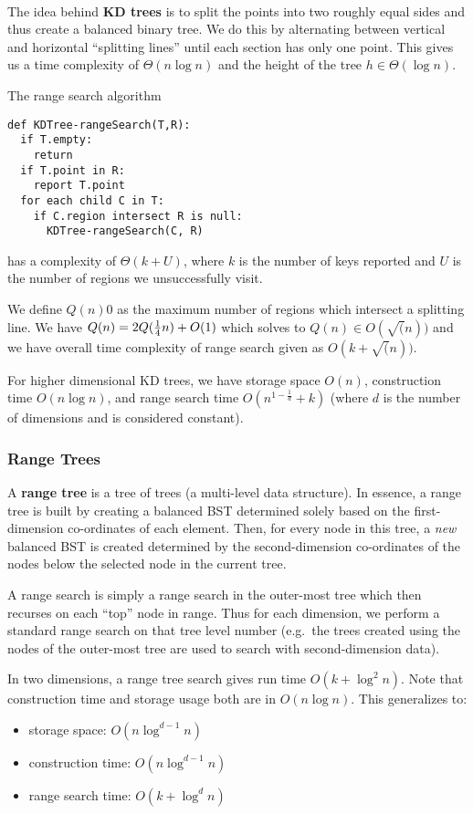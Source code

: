 \documentclass[12pt]{article}
\begin{document}
\paragraph{} The idea behind {\bf KD trees} is to split the points into two roughly equal sides and thus create a balanced binary tree. We do this by alternating between vertical and horizontal ``splitting lines'' until each section has only one point. This gives us a time complexity of $\Theta(n\log n)$ and the height of the tree $h\in \Theta(\log n)$.

The range search algorithm
\begin{verbatim}
def KDTree-rangeSearch(T,R):
  if T.empty:
    return
  if T.point in R:
    report T.point
  for each child C in T:
    if C.region intersect R is null:
      KDTree-rangeSearch(C, R)
\end{verbatim}
has a complexity of $\Theta(k + U)$, where $k$ is the number of keys reported and $U$ is the number of regions we unsuccessfully visit.

We define $Q(n)0$ as the maximum number of regions which intersect a splitting line. We have $Q(n) = 2Q(\frac{1}{4} n) + O(1)$ which solves to $Q(n) \in O(\sqrt(n))$ and we have overall time complexity of range search given as $O(k + \sqrt(n))$.

For higher dimensional KD trees, we have storage space $O(n)$, construction time $O(n\log n)$, and range search time $O(n^{1-\frac{1}{d}} + k)$ (where $d$ is the number of dimensions and is considered constant).

\subsubsection{Range Trees}
A {\bf range tree} is a tree of trees (a multi-level data structure). In essence, a range tree is built by creating a balanced BST determined solely based on the first-dimension co-ordinates of each element. Then, for every node in this tree, a \emph{new} balanced BST is created determined by the second-dimension co-ordinates of the nodes below the selected node in the current tree.

A range search is simply a range search in the outer-most tree which then recurses on each ``top'' node in range. Thus for each dimension, we perform a standard range search on that tree level number (e.g.\ the trees created using the nodes of the outer-most tree are used to search with second-dimension data).

In two dimensions, a range tree search gives run time $O(k + \log^2 n)$. Note that construction time and storage usage both are in $O(n\log n)$. This generalizes to:
\begin{itemize}
\item storage space: $O(n\log^{d-1} n)$
\item construction time: $O(n\log^{d-1} n)$
\item range search time: $O(k + \log^d n)$
\end{itemize}
\end{document}

